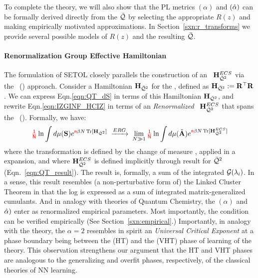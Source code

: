 To complete the theory, we
will also show that the \HTSR PL \LayerQuality metrics \ALPHA $(\alpha)$  and \ALPHAHAT $(\hat\alpha)$
can be formally derived directly from the \SETOL \LayerQuality $\bar{\mathcal{Q}}$ by selecting the appropriate
\RTransform $R(z)$ and making empirically motivated approximations. In Section~\ref{sxn:r_transforms} we provide several possible
models of $R(z)$ and the resulting \LayerQuality $\bar{\mathcal{Q}}$.

\paragraph{Renormalization Group Effective Hamiltonian}
The formulation of SETOL closely parallels the construction of an \EffectiveHamiltonian~$\mathbf{H}^{ECS}_{\bar{\mathcal{Q}}^{2}}$
via the \WilsonExactRenormalizationGroup~(\ERG) approach. Consider a \emph{\Bare} Hamiltonian $\mathbf{H}_{\bar{\mathcal{Q}}^{2}}$ for the \LayerQualitySquared,
defined as $\mathbf{H}_{\bar{\mathcal{Q}}^{2}}:= \mathbf{R}^{\top}\mathbf{R}$.
We can express Eqn.\ref{eqn:QT_dS} in terms of this \Bare Hamiltonian $\mathbf{H}_{\bar{\mathcal{Q}}^{2}}$,
and rewrite Eqn.\ref{eqn:IZGINF_HCIZ} in terms of an \emph{Renormalized} \EffectiveHamiltonian~$\mathbf{H}^{ECS}_{\bar{\mathcal{Q}}^{2}}$
that spans the \EffectiveCorrelationSpace~(\ECS). Formally, we have:
\begin{align}
\label{eqn:RG}
{\color{red}\sf{\tfrac{1}{N}}}\ln \int d\mu({\mathbf{S}})e^{{\color{red}\sf{n}} \beta N \operatorname{Tr}[\mathbf{H}_{\bar{\mathcal{Q}}^{2}}]} \;\xrightarrow{ERG}\; \lim_{N\gg 1}{\color{red}\sf{\tfrac{1}{N}}}\ln \int d\mu(\tilde{\mathbf{A}})e^{{\color{red}\sf{n}} \beta N \operatorname{Tr}[\mathbf{H}^{ECS}_{\bar{\mathcal{Q}}^{2}}]} 
\end{align}
where the \ERG transformation is defined by the \ScaleInvariant change of measure ,
applied in a \LargeN expansion,
and where $\mathbf{H}^{ECS}_{\bar{\mathcal{Q}}^{2}}$ is defined implicitly through result for $\bar{\mathcal{Q}}^{2}$ (Eqn.~\ref{eqn:QT_result}).
The result is, formally, a sum of the integrated \RTransforms $\mathcal{G}(\lambda_{i})$.
In a sense, this result resembles (a non-perturbative form of) the Linked Cluster Theorem
in that the log \PartitionFunction is expressed as a sum of integrated matrix-generalized cumulants.  And in analogy with \SemiEmpirical theories of Quantum Chemistry, the \HTSR \ALPHA $(\alpha)$ and \ALPHAHAT $\hat\alpha)$ enter as renormalized empirical parameters.
Most importantly, the \ScaleInvariant \TRACELOG condition can be verified empirically (See Section~\ref{sxn:empirical}.)
Importantly, in analogy with the \WilsonExactRenormalizatonGroup theory, 
the \HTSR $\alpha=2$ resembles in spirit
an \ERG \emph{Universal Critical Exponent} at a phase boundary being between the \HeavyTailed 
(HT) and the \VeryHeavyTailed (VHT) phase of learning of the \HTSR theory.
This observation strengthens our argument that the \HTSR HT and VHT phases
are analogous to the generalizing and overfit phases, respectively,
of the classical \SMOG theories of NN learning.



